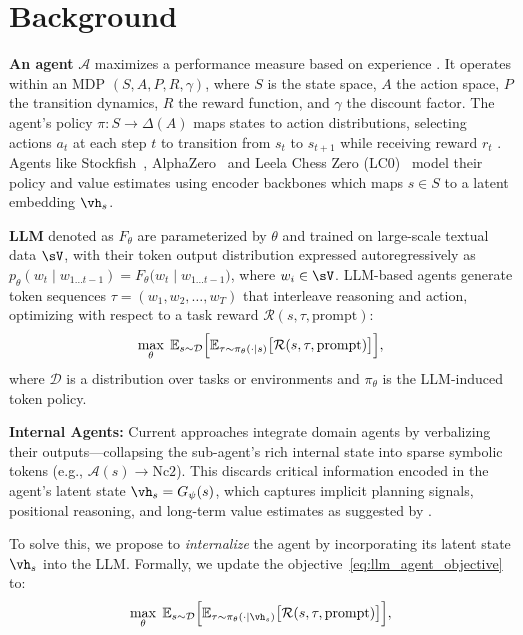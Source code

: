 \section{Background}
\vspace{-2mm}
\textbf{An agent} \(\mathcal{A}\) maximizes a performance measure based on experience \cite{russell1995artificial}. It operates within an MDP \((S, A, P, R, \gamma)\), where \(S\) is the state space, \(A\) the action space, \(P\) the transition dynamics, \(R\) the reward function, and \(\gamma\) the discount factor. The agent's policy \(\pi: S \rightarrow \Delta(A)\) maps states to action distributions, selecting actions \(a_t\) at each step \(t\) to transition from \(s_t\) to \(s_{t+1}\) while receiving reward \(r_t\) \cite{puterman2014markov,sutton1999reinforcement}. Agents like Stockfish~\cite{maharaj2022chess}, AlphaZero~\cite{silver2017mastering} and Leela Chess Zero (LC0)~\cite{monroe2024mastering} model their policy and value estimates using encoder backbones \cite{nasu2018efficiently} which maps \(s\in S\) to a latent embedding \(\vh_{s}\).

\textbf{LLM} denoted as \(F_{\theta}\) are parameterized by $\theta$ and trained on large-scale textual data \(\sV\), with their token output distribution expressed autoregressively as \(p_{\theta}(w_{t} \mid w_{1\ldots t-1}) = F_{\theta}\bigl(w_{t}\;\big|\;w_{1\ldots t-1}\bigr)\), where $w_i \in \sV$. LLM-based agents generate token sequences \(\tau = (w_1, w_2, \dots, w_T)\) that interleave reasoning and action, optimizing with respect to a task reward \(\mathcal{R}(s, \tau, \text{prompt})\):
\vspace{-2mm}
\begin{equation}
\max_\theta \; \mathbb{E}_{s \sim \mathcal{D}} \Bigl[
  \mathbb{E}_{\tau \sim \pi_\theta(\cdot \mid s)} \bigl[\mathcal{R}(s, \tau, \text{prompt})\bigr]
\Bigr],
\label{eq:llm_agent_objective}
\end{equation}
where \(\mathcal{D}\) is a distribution over tasks or environments and \(\pi_\theta\) is the LLM-induced token policy.

\textbf{Internal Agents:} Current approaches integrate domain agents by verbalizing their outputs—collapsing the sub-agent's rich internal state into sparse symbolic tokens (e.g., $\mathcal{A}(s) \to \text{Nc2}$). This discards critical information encoded in the agent's latent state $\vh_s = G_\psi(s)$, which captures implicit planning signals, positional reasoning, and long-term value estimates as suggested by \citet{jenner2024evidence}.

To solve this, we propose to \emph{internalize} the agent by incorporating its latent state $\vh_s$ into the LLM. Formally, we update the objective~\ref{eq:llm_agent_objective} to:
\vspace{-2mm}
\begin{equation}
\max_\theta \; \mathbb{E}_{s \sim \mathcal{D}} \Bigl[
  \mathbb{E}_{\tau \sim \pi_\theta(\cdot \mid\vh_s)} \bigl[\mathcal{R}(s, \tau, \text{prompt})\bigr]
\Bigr],
\label{eq:llamia_agent_objective}
\end{equation}

